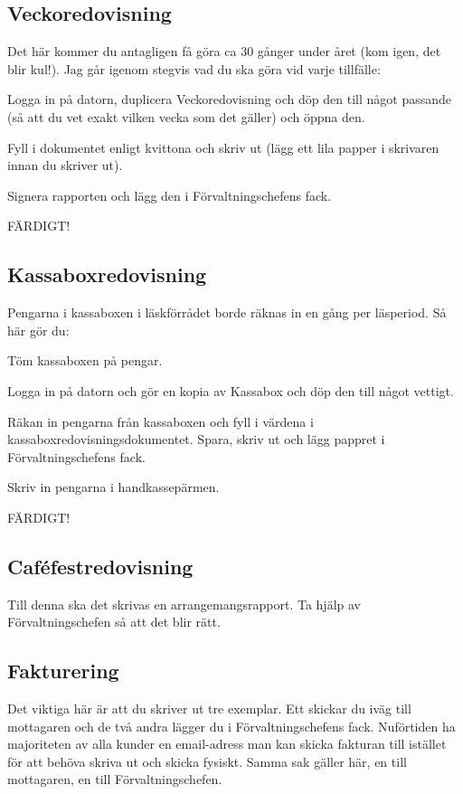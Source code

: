 \documentclass[10pt]{article}
\begin{document}
\subsection{Veckoredovisning}
Det här kommer du antagligen få göra ca 30 gånger under året (kom igen, det blir kul!). Jag går igenom stegvis vad du ska göra vid varje tillfälle:
\begin{numplist}
\item Logga in på datorn, duplicera Veckoredovisning och döp den till något passande (så att du vet exakt vilken vecka som det gäller) och öppna den.
\item Fyll i dokumentet enligt kvittona och skriv ut (lägg ett lila papper i skrivaren innan du skriver ut).
\item Signera rapporten och lägg den i Förvaltningschefens fack.
\item FÄRDIGT!
\end{numplist}

\subsection{Kassaboxredovisning}
Pengarna i kassaboxen i läskförrådet borde räknas in en gång per läsperiod. Så här gör du:
\begin{numplist}
\item Töm kassaboxen på pengar.
\item Logga in på datorn och gör en kopia av Kassabox och döp den till något vettigt.
\item Räkan in pengarna från kassaboxen och fyll i värdena i kassaboxredovisningsdokumentet. Spara, skriv ut och lägg pappret i Förvaltningschefens fack.
\item Skriv in pengarna i handkassepärmen.
\item FÄRDIGT!
\end{numplist}

\subsection{Caféfestredovisning}
Till denna ska det skrivas en arrangemangsrapport. Ta hjälp av Förvaltningschefen så att det blir rätt.

\subsection{Fakturering}
Det viktiga här är att du skriver ut tre exemplar. Ett skickar du iväg till mottagaren och de två andra lägger du i Förvaltningschefens fack. Nuförtiden ha majoriteten av alla kunder en email-adress man kan skicka fakturan till istället för att behöva skriva ut och skicka fysiskt. Samma sak gäller här, en till mottagaren, en till Förvaltningschefen.
\end{document}
